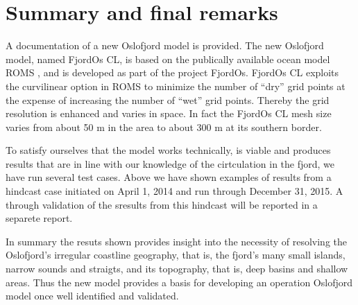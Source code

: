 \newpage
\section{Summary and final remarks}
\label{sec:summa}
A documentation of a new Oslofjord model is provided. The new Oslofjord model, named FjordOs CL, is based on the publically available ocean model ROMS \citep{shche:mcwil:2005,shche:mcwil:2009,haidv:etal:2008}, and is developed as part of the project FjordOs. FjordOs CL exploits the curvilinear option in ROMS to minimize the number of ``dry'' grid points at the expense of increasing the number of ``wet'' grid points. Thereby the grid resolution is enhanced and varies in space. In fact the FjordOs CL mesh size varies from about 50 m in the {\DR} area to about 300 m at its southern border. 

To satisfy ourselves that the model works technically, is viable and produces results that are in line with our knowledge of the cirtculation in the fjord, we have run several test cases. Above we have shown examples of results from a hindcast case initiated on April 1, 2014 and run through December 31, 2015. A through validation of the sresults from this hindcast will be reported in a separete report.

In summary the resuts shown provides insight into the necessity of resolving the Oslofjord's irregular coastline geography, that is, the fjord's many small islands, narrow sounds and straigts, and its topography, that is, deep basins and shallow areas. Thus the new model provides a basis for developing an operation Oslofjord model once well identified and validated.
